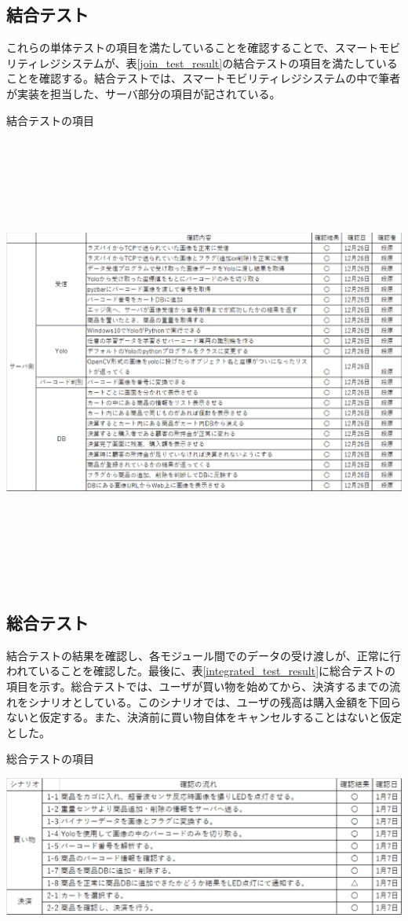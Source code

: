 \newpage

\subsection{結合テスト}

これらの単体テストの項目を満たしていることを確認することで、スマートモビリティレジシステムが、表\ref{join_test_result}の結合テストの項目を満たしていることを確認する。結合テストでは、スマートモビリティレジシステムの中で筆者が実装を担当した、サーバ部分の項目が記されている。

\begin{table}[htbp]
\centering
\caption{結合テストの項目}
\includegraphics[height=15cm,width=15cm]{./pic/result/join_test_result.eps}
\label{join_test_result}
\end{table}

\newpage

\subsection{総合テスト}

結合テストの結果を確認し、各モジュール間でのデータの受け渡しが、正常に行われていることを確認した。最後に、表\ref{integrated_test_result}に総合テストの項目を示す。総合テストでは、ユーザが買い物を始めてから、決済するまでの流れをシナリオとしている。このシナリオでは、ユーザの残高は購入金額を下回らないと仮定する。また、決済前に買い物自体をキャンセルすることはないと仮定とした。

\begin{table}[htbp]
\centering
\caption{総合テストの項目}
\includegraphics[width=15cm]{./pic/result/integrated_test_result.eps}
\label{integrated_test_result}
\end{table}